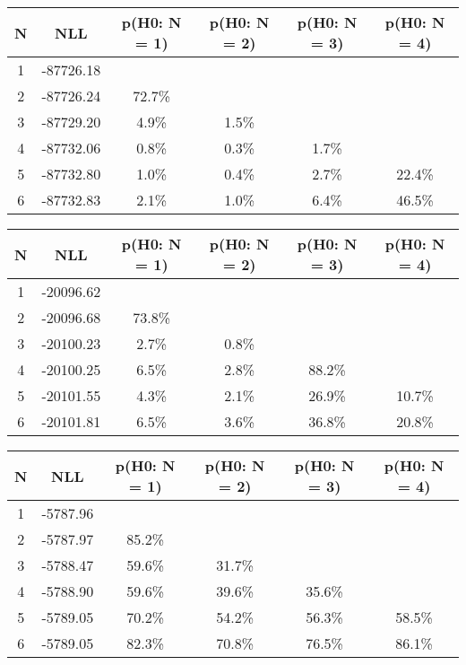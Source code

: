 \begin{table}[htb]
	\begin{center}
{\footnotesize\renewcommand{\arraystretch}{1.4}
		\begin{tabular}{cc||cccc}
			N & NLL & p(H0: N = 1) & p(H0: N = 2) & p(H0: N = 3) & p(H0: N = 4)\\ 
		\hline
1 & -87726.18 & & & & \\
2 & -87726.24 & 72.7\% & & & \\
3 & -87729.20 & 4.9\% & 1.5\% & & \\
4 & -87732.06 & 0.8\% & 0.3\% & 1.7\% & \\
5 & -87732.80 & 1.0\% & 0.4\% & 2.7\% & 22.4\% \\
6 & -87732.83 & 2.1\% & 1.0\% & 6.4\% & 46.5\% \\
	\end{tabular}
		\label{tab:lab}
	}
	\end{center}\end{table}

\begin{table}[htb]
	\begin{center}
{\footnotesize\renewcommand{\arraystretch}{1.4}
		\begin{tabular}{cc||cccc}
			N & NLL & p(H0: N = 1) & p(H0: N = 2) & p(H0: N = 3) & p(H0: N = 4)\\ 
		\hline
1 & -20096.62 & & & & \\
2 & -20096.68 & 73.8\% & & & \\
3 & -20100.23 & 2.7\% & 0.8\% & & \\
4 & -20100.25 & 6.5\% & 2.8\% & 88.2\% & \\
5 & -20101.55 & 4.3\% & 2.1\% & 26.9\% & 10.7\% \\
6 & -20101.81 & 6.5\% & 3.6\% & 36.8\% & 20.8\% \\
	\end{tabular}
		\label{tab:lab}
	}
	\end{center}\end{table}

\begin{table}[htb]
	\begin{center}
{\footnotesize\renewcommand{\arraystretch}{1.4}
		\begin{tabular}{cc||cccc}
			N & NLL & p(H0: N = 1) & p(H0: N = 2) & p(H0: N = 3) & p(H0: N = 4)\\ 
		\hline
1 & -5787.96 & & & & \\
2 & -5787.97 & 85.2\% & & & \\
3 & -5788.47 & 59.6\% & 31.7\% & & \\
4 & -5788.90 & 59.6\% & 39.6\% & 35.6\% & \\
5 & -5789.05 & 70.2\% & 54.2\% & 56.3\% & 58.5\% \\
6 & -5789.05 & 82.3\% & 70.8\% & 76.5\% & 86.1\% \\
	\end{tabular}
		\label{tab:lab}
	}
	\end{center}\end{table}

